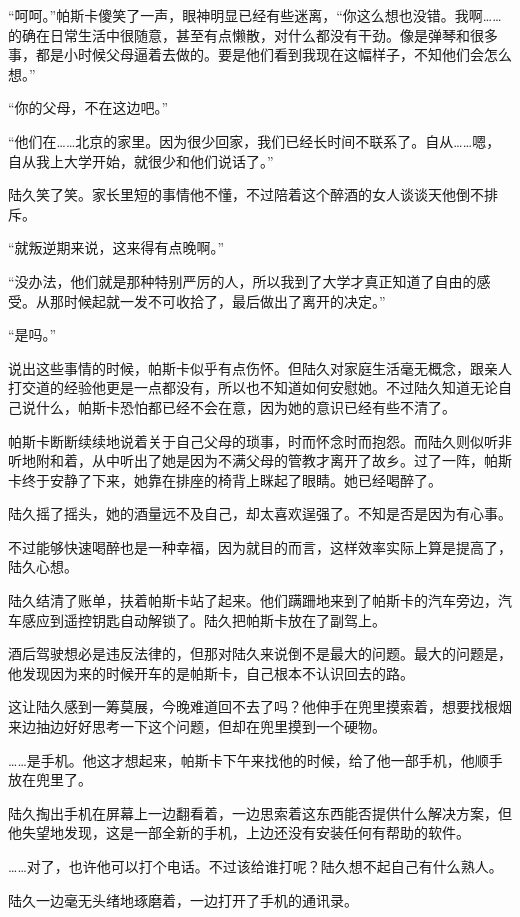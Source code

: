 “呵呵。”帕斯卡傻笑了一声，眼神明显已经有些迷离，“你这么想也没错。我啊……的确在日常生活中很随意，甚至有点懒散，对什么都没有干劲。像是弹琴和很多事，都是小时候父母逼着去做的。要是他们看到我现在这幅样子，不知他们会怎么想。”

“你的父母，不在这边吧。”

“他们在……北京的家里。因为很少回家，我们已经长时间不联系了。自从……嗯，自从我上大学开始，就很少和他们说话了。”

陆久笑了笑。家长里短的事情他不懂，不过陪着这个醉酒的女人谈谈天他倒不排斥。

“就叛逆期来说，这来得有点晚啊。”

“没办法，他们就是那种特别严厉的人，所以我到了大学才真正知道了自由的感受。从那时候起就一发不可收拾了，最后做出了离开的决定。”

“是吗。”

说出这些事情的时候，帕斯卡似乎有点伤怀。但陆久对家庭生活毫无概念，跟亲人打交道的经验他更是一点都没有，所以也不知道如何安慰她。不过陆久知道无论自己说什么，帕斯卡恐怕都已经不会在意，因为她的意识已经有些不清了。

帕斯卡断断续续地说着关于自己父母的琐事，时而怀念时而抱怨。而陆久则似听非听地附和着，从中听出了她是因为不满父母的管教才离开了故乡。过了一阵，帕斯卡终于安静了下来，她靠在排座的椅背上眯起了眼睛。她已经喝醉了。

陆久摇了摇头，她的酒量远不及自己，却太喜欢逞强了。不知是否是因为有心事。

不过能够快速喝醉也是一种幸福，因为就目的而言，这样效率实际上算是提高了，陆久心想。

陆久结清了账单，扶着帕斯卡站了起来。他们蹒跚地来到了帕斯卡的汽车旁边，汽车感应到遥控钥匙自动解锁了。陆久把帕斯卡放在了副驾上。

酒后驾驶想必是违反法律的，但那对陆久来说倒不是最大的问题。最大的问题是，他发现因为来的时候开车的是帕斯卡，自己根本不认识回去的路。

这让陆久感到一筹莫展，今晚难道回不去了吗？他伸手在兜里摸索着，想要找根烟来边抽边好好思考一下这个问题，但却在兜里摸到一个硬物。

……是手机。他这才想起来，帕斯卡下午来找他的时候，给了他一部手机，他顺手放在兜里了。

陆久掏出手机在屏幕上一边翻看着，一边思索着这东西能否提供什么解决方案，但他失望地发现，这是一部全新的手机，上边还没有安装任何有帮助的软件。

……对了，也许他可以打个电话。不过该给谁打呢？陆久想不起自己有什么熟人。

陆久一边毫无头绪地琢磨着，一边打开了手机的通讯录。

